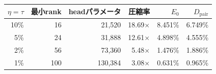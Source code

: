 \begin{tabular}{rrrrrr}
\toprule
$\eta=\tau$ & 最小rank & headパラメータ & 圧縮率 & $E_0$ & $D_{\mathrm{pair}}$ \\
\midrule
10\% & 16 & 21,520 & 18.69$\times$ & 8.451\% & 6.749\% \\
5\% & 24 & 31,888 & 12.61$\times$ & 4.898\% & 4.555\% \\
2\% & 56 & 73,360 & 5.48$\times$ & 1.476\% & 1.886\% \\
1\% & 100 & 130,384 & 3.08$\times$ & 0.631\% & 0.965\% \\
\bottomrule
\end{tabular}
